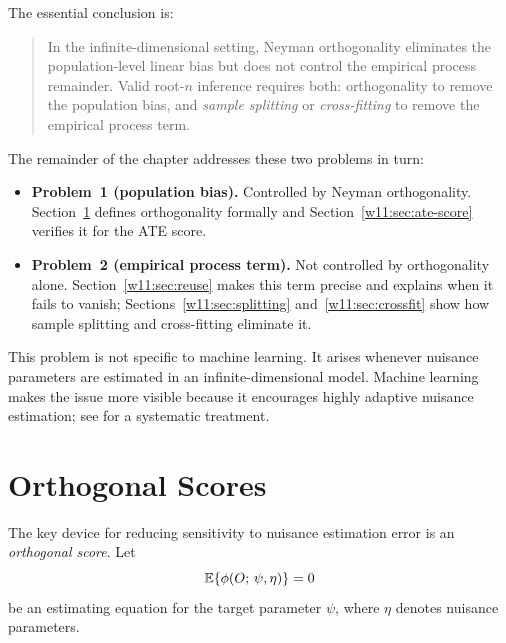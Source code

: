 \documentclass[master.tex]{subfiles}
\begin{document}
The essential conclusion is:
\begin{quote}
  In the infinite-dimensional setting, Neyman orthogonality
  eliminates the population-level linear bias but does not
  control the empirical process remainder.  Valid root-$n$
  inference requires both: orthogonality to remove the
  population bias, and \emph{sample splitting} or
  \emph{cross-fitting} to remove the empirical process term.
\end{quote}
The remainder of the chapter addresses these two problems in turn:
\begin{itemize}
  \item \textbf{Problem~1 (population bias).}  Controlled by
    Neyman orthogonality.  Section~\ref{w11:sec:orthogonal}
    defines orthogonality formally and
    Section~\ref{w11:sec:ate-score} verifies it for the ATE score.
  \item \textbf{Problem~2 (empirical process term).}  Not
    controlled by orthogonality alone.  Section~\ref{w11:sec:reuse}
    makes this term precise and explains when it fails to vanish;
    Sections~\ref{w11:sec:splitting} and~\ref{w11:sec:crossfit}
    show how sample splitting and cross-fitting eliminate it.
\end{itemize}

\begin{remark}
  This problem is not specific to machine learning.  It arises
  whenever nuisance parameters are estimated in an
  infinite-dimensional model.  Machine learning makes the issue
  more visible because it encourages highly adaptive nuisance
  estimation; see \citet{chernozhukov2018double} for a systematic
  treatment.
\end{remark}


\section{Orthogonal Scores}
\label{w11:sec:orthogonal}

The key device for reducing sensitivity to nuisance estimation error
is an \emph{orthogonal score}.  Let
\[
  \mathbb{E}\{\phi(O;\,\psi,\eta)\} = 0
\]
be an estimating equation for the target parameter $\psi$, where
$\eta$ denotes nuisance parameters.
\end{document}
